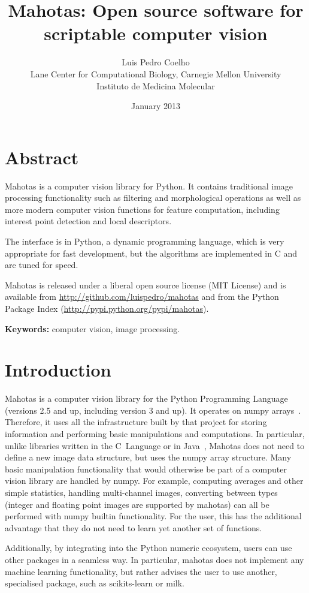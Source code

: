 \documentclass{scrartcl}
\title{Mahotas: Open source software for scriptable computer vision}
\author{Luis Pedro Coelho\\
Lane Center for Computational Biology, Carnegie Mellon University\\
Instituto de Medicina Molecular}
\date{January 2013}
\newcommand*{\cpp}{{C\nolinebreak[4]\hspace{-.05em}\raisebox{.4ex}{\tiny\textbf{++}}}}
\begin{document}
\maketitle

\section*{Abstract}
Mahotas is a computer vision library for Python. It contains traditional image
processing functionality such as filtering and morphological operations as well
as more modern computer vision functions for feature computation, including
interest point detection and local descriptors.

The interface is in Python, a dynamic programming language, which is very
appropriate for fast development, but the algorithms are implemented in \cpp{}
and are tuned for speed.

Mahotas is released under a liberal open source license (MIT License) and is
available from \url{http://github.com/luispedro/mahotas} and from the Python Package
Index (\url{http://pypi.python.org/pypi/mahotas}).

\textbf{Keywords:} computer vision, image processing.

\section{Introduction}

Mahotas is a computer vision library for the Python Programming Language
(versions 2.5 and up, including version 3 and up). It operates on numpy
arrays~\citep{numpystructure}. Therefore, it uses all the infrastructure built
by that project for storing information and performing basic manipulations and
computations. In particular, unlike libraries written in the C~Language or in
Java~\citep{Marcel:2010:TMP:1873951.1874254}, Mahotas does not need to define a
new image data structure, but uses the numpy array structure. Many basic
manipulation functionality that would otherwise be part of a computer vision
library are handled by numpy. For example, computing averages and other simple
statistics, handling multi-channel images, converting between types (integer
and floating point images are supported by mahotas) can all be performed with
numpy builtin functionality. For the user, this has the additional advantage
that they do not need to learn yet another set of functions.

Additionally, by integrating into the Python numeric ecosystem, users can use
other packages in a seamless way. In particular, mahotas does not implement any
machine learning functionality, but rather advises the user to use another,
specialised package, such as scikits-learn or milk.
\end{document}
